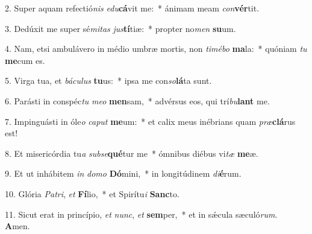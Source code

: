2. Super aquam refectió\textit{nis} \textit{e}\textit{du}\textbf{cá}vit me:~*  ánimam meam \textit{con}\textbf{vér}tit.\

3. Dedúxit me super sé\textit{mi}\textit{tas} \textit{jus}\textbf{tí}tiæ:~*  propter no\textit{men} \textbf{su}um.\

4. Nam, etsi ambulávero in médio umbræ mortis, non \textit{ti}\textit{mé}\textit{bo} \textbf{ma}la:~*  quóniam \textit{tu} \textbf{me}cum es.\

5. Virga tua, et \textit{bá}\textit{cu}\textit{lus} \textbf{tu}us:~*  ipsa me con\textit{so}\textbf{lá}ta sunt.\

6. Parásti in conspéc\textit{tu} \textit{me}\textit{o} \textbf{men}sam,~*  advérsus eos, qui trí\textit{bu}\textbf{lant} me.\

7. Impinguásti in óle\textit{o} \textit{ca}\textit{put} \textbf{me}um:~*  et calix meus inébrians quam \textit{præ}\textbf{clá}rus est!\

8. Et misericórdia tu\textit{a} \textit{sub}\textit{se}\textbf{qué}tur me~*  ómnibus diébus vi\textit{tæ} \textbf{me}æ.\

9. Et ut inhábitem \textit{in} \textit{do}\textit{mo} \textbf{Dó}mini,~*  in longitúdinem \textit{di}\textbf{é}rum.\

10. Glória \textit{Pa}\textit{tri}, \textit{et} \textbf{Fí}lio,~*  et Spirítu\textit{i} \textbf{Sanc}to.\

11. Sicut erat in princípio, \textit{et} \textit{nunc}, \textit{et} \textbf{sem}per,~*  et in sǽcula sæculó\textit{rum}. \textbf{A}men.\

